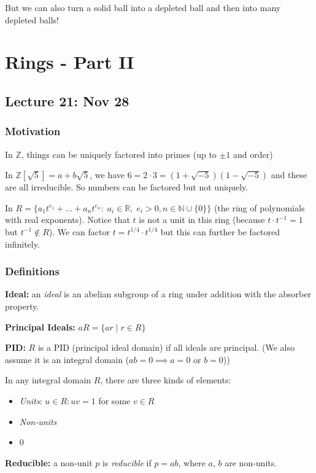 \documentclass[12pt]{report}
\newcommand{\R}{\mathbb{R}}
\newcommand{\Z}{\mathbb{Z}}
\newcommand{\N}{\mathbb{N}}
\begin{document}
        But we can also turn a solid ball into a depleted ball and then into many depleted balls!

\chapter*{Rings - Part II}
\section*{Lecture 21: Nov 28}
    \subsection*{Motivation}
        In $\Z$, things can be uniquely factored into primes (up to $\pm 1$ and order)

        In $\Z[\sqrt 5] = a + b\sqrt 5$, we have $6 = 2 \cdot 3 = (1 + \sqrt{-5})(1 - \sqrt{-5})$ and these are all irreducible. So numbers can be factored but not uniquely. 
        
        In $R = \{a_1 t^{e_1} + \dots + a_n t^{e_n}: \; a_i \in \R, \; e_i > 0, n \in \N \cup \{0\}\}$ (the ring of polynomials with real exponents). Notice that $t$ is not a unit in this ring (because $t\cdot t^{-1} = 1$ but $t^{-1} \not \in R$). We can factor $t = t^{1/4} \cdot t^{1/4}$ but this can further be factored infinitely.

    \subsection*{Definitions}
        \textbf{Ideal:} an \emph{ideal} is an abelian subgroup of a ring under addition with the absorber property. 

        \textbf{Principal Ideals:} $aR = \{ar \; | \; r \in R\}$

        \textbf{PID:} $R$ is a PID (principal ideal domain) if all ideals are principal. (We also assume it is an integral domain ($ab = 0 \implies a = 0 \text{ or } b = 0$))

        In any integral domain $R$, there are three kinds of elements:
        \begin{itemize}
            \item \emph{Units}: $u \in R: uv = 1$ for some $v \in R$ 
            \item \emph{Non-units}
            \item $0$
        \end{itemize}

        \textbf{Reducible:} a non-unit $p$ is \emph{reducible} if $p = ab$, where $a$, $b$ are non-units.
\end{document}
